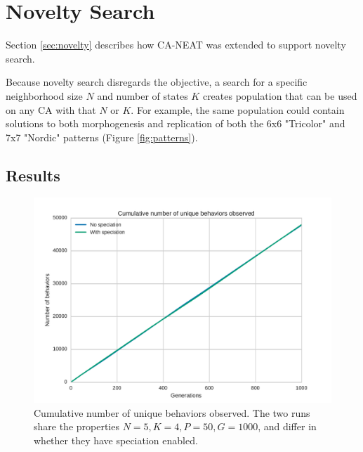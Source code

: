 \section{Novelty Search}
Section \ref{sec:novelty} describes how CA-NEAT was extended to support novelty search.

Because novelty search disregards the objective,
a search for a specific neighborhood size $N$ and number of states $K$ creates population that can be used on any CA with that $N$ or $K$.
For example, the same population could contain solutions to both morphogenesis and replication of both the 6x6 "Tricolor" and 7x7 "Nordic" patterns (Figure \ref{fig:patterns}).

\subsection{Results}
\begin{figure}
\centering
\includegraphics[height=0.4\textheight, width=\textwidth, keepaspectratio]{fig/novelty_diversity}
\caption[
    Cumulative number of unique behaviors observed
]{
    Cumulative number of unique behaviors observed.
    The two runs share the properties $N=5, K=4, P=50, G=1000$, and differ in whether they have speciation enabled.
}
\label{fig:novelty_diversity}
\end{figure}

